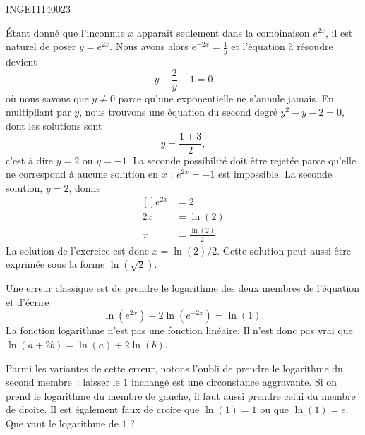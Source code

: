 

\begin{corrige}{INGE11140023}

	Étant donné que l'inconnue $x$ apparaît seulement dans la combinaison $e^{2x}$, il est naturel de poser $y= e^{2x}$. Nous avons alors $ e^{-2x}=\frac{1}{ y }$ et l'équation à résoudre devient
	\begin{equation}
		y-\frac{ 2 }{ y }-1=0
	\end{equation}
	où nous savons que $y\neq 0$ parce qu'une exponentielle ne s'annule jamais. En multipliant par $y$, nous trouvons une équation du second degré $y^2-y-2=0$, dont les solutions sont
	\begin{equation}
		y=\frac{ 1\pm 3 }{2},
	\end{equation}
	c'est à dire $y=2$ ou $y=-1$. La seconde possibilité doit être rejetée parce qu'elle ne correspond à aucune solution en $x$ : $ e^{2x}=-1$ est impossible. La seconde solution, $y=2$, donne
	\begin{equation}
		\begin{aligned}[]
			e^{2x}&=2\\
			2x&=\ln(2)\\
			x&=\frac{ \ln(2) }{ 2 }.
		\end{aligned}
	\end{equation}
	La solution de l'exercice est donc $x=\ln(2)/2$. Cette solution peut aussi être exprimée sous la forme $\ln(\sqrt{2})$.

	\begin{remark}
		Une erreur classique est de prendre le logarithme des deux membres de l'équation et d'écrire
		\begin{equation}
			\ln( e^{2x})-2\ln( e^{-2x})=\ln(1).
		\end{equation}
		La fonction logarithme n'est pas une fonction linéaire. Il n'est donc pas vrai que $\ln(a+2b)=\ln(a)+2\ln(b)$.

		Parmi les variantes de cette erreur, notons l'oubli de prendre le logarithme du second membre~: laisser le $1$ inchangé est une circonstance aggravante. Si on prend le logarithme du membre de gauche, il faut aussi prendre celui du membre de droite. Il est également faux de croire que $\ln(1)=1$ ou que $\ln(1)=e$. Que vaut le logarithme de $1$ ?
	\end{remark}
	

\end{corrige}
